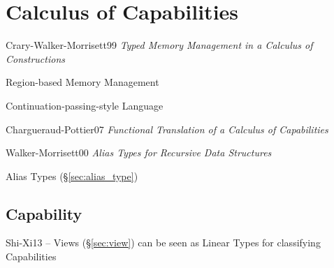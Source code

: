 \section{Calculus of Capabilities}\label{sec:capabilities_calculus}

Crary-Walker-Morrisett99 \emph{Typed Memory Management in a Calculus
  of Constructions}

Region-based Memory Management

Continuation-passing-style Language

Chargueraud-Pottier07 \emph{Functional Translation of a Calculus of
  Capabilities}

Walker-Morrisett00 \emph{Alias Types for Recursive Data Structures}

Alias Types (\S\ref{sec:alias_type})



\subsection{Capability}\label{sec:capability}

Shi-Xi13 -- Views (\S\ref{sec:view}) can be seen as Linear Types for
classifying Capabilities
